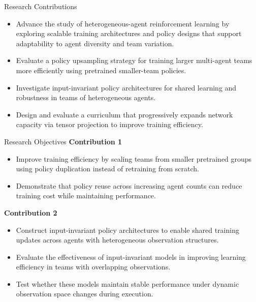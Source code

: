 \documentclass[xcolor={svgnames},aspectratio=169]{beamer}
\begin{document}
\begin{frame}{Research Contributions}
    \begin{itemize}
        \item {%
            Advance the study of heterogeneous-agent reinforcement learning by exploring 
            scalable training architectures and policy designs that support adaptability 
            to agent diversity and team variation.}
        \item {%
            Evaluate a policy upsampling strategy for training larger multi-agent teams 
            more efficiently using pretrained smaller-team policies.}
        \item {%
            Investigate input-invariant policy architectures for shared learning and 
            robustness in teams of heterogeneous agents.}
        \item {%
            Design and evaluate a curriculum that progressively expands network capacity 
            via tensor projection to improve training efficiency.}
    \end{itemize}
\end{frame}

\begin{frame}{Research Objectives}
    \textbf{Contribution 1}
    \begin{itemize}
        \item {Improve training efficiency by scaling teams from smaller pretrained groups 
            using policy duplication instead of retraining from scratch.}
        \item {Demonstrate that policy reuse across increasing agent counts can reduce 
            training cost while maintaining performance.}
    \end{itemize}
    \vspace{1em}
    \textbf{Contribution 2}
    \begin{itemize}
        \item {Construct input-invariant policy architectures to enable shared training 
            updates across agents with heterogeneous observation structures.}
        \item {Evaluate the effectiveness of input-invariant models in improving learning 
            efficiency in teams with overlapping observations.}
        \item {Test whether these models maintain stable performance under dynamic 
            observation space changes during execution.}
    \end{itemize}
\end{frame}
\end{document}
